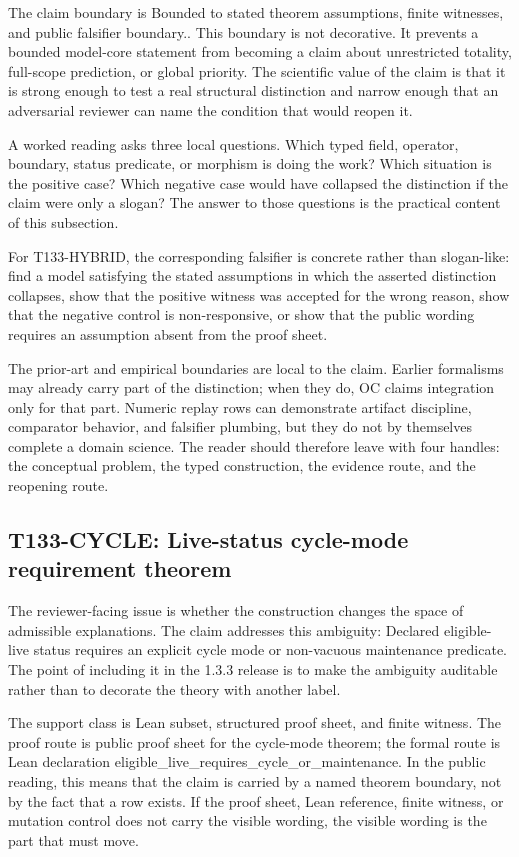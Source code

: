 The claim boundary is Bounded to stated theorem assumptions, finite witnesses, and public falsifier boundary.. This boundary is not decorative. It prevents a bounded model-core statement from becoming a claim about unrestricted totality, full-scope prediction, or global priority. The scientific value of the claim is that it is strong enough to test a real structural distinction and narrow enough that an adversarial reviewer can name the condition that would reopen it.

A worked reading asks three local questions. Which typed field, operator, boundary, status predicate, or morphism is doing the work? Which situation is the positive case? Which negative case would have collapsed the distinction if the claim were only a slogan? The answer to those questions is the practical content of this subsection.

For T133-HYBRID, the corresponding falsifier is concrete rather than slogan-like: find a model satisfying the stated assumptions in which the asserted distinction collapses, show that the positive witness was accepted for the wrong reason, show that the negative control is non-responsive, or show that the public wording requires an assumption absent from the proof sheet.

The prior-art and empirical boundaries are local to the claim. Earlier formalisms may already carry part of the distinction; when they do, OC claims integration only for that part. Numeric replay rows can demonstrate artifact discipline, comparator behavior, and falsifier plumbing, but they do not by themselves complete a domain science. The reader should therefore leave with four handles: the conceptual problem, the typed construction, the evidence route, and the reopening route.

\subsection{T133-CYCLE: Live-status cycle-mode requirement theorem}
The reviewer-facing issue is whether the construction changes the space of admissible explanations. The claim addresses this ambiguity: Declared eligible-live status requires an explicit cycle mode or non-vacuous maintenance predicate. The point of including it in the 1.3.3 release is to make the ambiguity auditable rather than to decorate the theory with another label.

The support class is Lean subset, structured proof sheet, and finite witness. The proof route is public proof sheet for the cycle-mode theorem; the formal route is Lean declaration eligible\_live\_requires\_cycle\_or\_maintenance. In the public reading, this means that the claim is carried by a named theorem boundary, not by the fact that a row exists. If the proof sheet, Lean reference, finite witness, or mutation control does not carry the visible wording, the visible wording is the part that must move.


